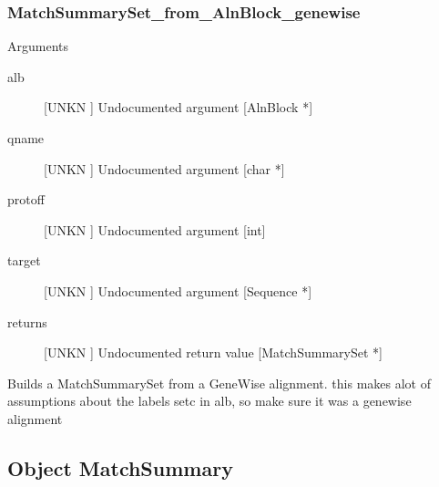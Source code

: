 \subsubsection{MatchSummarySet_from_AlnBlock_genewise}

Arguments
\begin{description}
\item[alb] [UNKN ] Undocumented argument [AlnBlock *]
\item[qname] [UNKN ] Undocumented argument [char *]
\item[protoff] [UNKN ] Undocumented argument [int]
\item[target] [UNKN ] Undocumented argument [Sequence *]
\item[returns] [UNKN ] Undocumented return value [MatchSummarySet *]
\end{description}
Builds a MatchSummarySet from a
GeneWise alignment. this makes
alot of assumptions about the labels
setc in alb, so make sure it was a 
genewise alignment 


\subsection{Object MatchSummary}

\label{object_MatchSummary}


